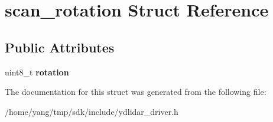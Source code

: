 \hypertarget{structscan__rotation}{}\section{scan\+\_\+rotation Struct Reference}
\label{structscan__rotation}
\subsection*{Public Attributes}
\begin{DoxyCompactItemize}
\item 
uint8\+\_\+t {\bfseries rotation}\hypertarget{structscan__rotation_a22cb3689e04952bbd07cdac97ecad4a0}{}\label{structscan__rotation_a22cb3689e04952bbd07cdac97ecad4a0}

\end{DoxyCompactItemize}


The documentation for this struct was generated from the following file\+:\begin{DoxyCompactItemize}
\item 
/home/yang/tmp/sdk/include/ydlidar\+\_\+driver.\+h\end{DoxyCompactItemize}
